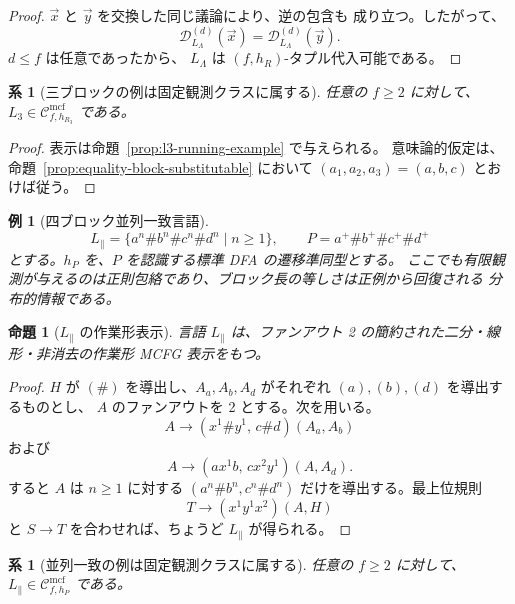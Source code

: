 \documentclass[11pt,a4paper]{ltjsarticle}
\newtheorem{proposition}[theorem]{命題}
\newtheorem{corollary}[theorem]{系}
\newtheorem{example}[theorem]{例}
\theoremstyle{remark}
\newcommand{\Cmcf}[2]{\mathcal{C}^{\mathrm{mcf}}_{#1,#2}}
\newcommand{\D}{\mathcal{D}}
\newcommand{\tuple}[1]{\vec{#1}}
\begin{document}
\begin{proof}
\(\tuple x\) と \(\tuple y\) を交換した同じ議論により、逆の包含も
成り立つ。したがって、
\[
  \D_{L_\Lambda}^{(d)}(\tuple x)
  =
  \D_{L_\Lambda}^{(d)}(\tuple y).
\]
\(d\le f\) は任意であったから、
\(L_\Lambda\) は \((f,h_R)\)-タプル代入可能である。
\end{proof}



\begin{corollary}[三ブロックの例は固定観測クラスに属する]
\label{cor:l3-in-fixed-observation-class}
任意の \(f\ge2\) に対して、\(L_3\in\Cmcf{f}{h_{R_3}}\) である。
\end{corollary}

\begin{proof}
表示は命題~\ref{prop:l3-running-example} で与えられる。
意味論的仮定は、命題~\ref{prop:equality-block-substitutable} において
\((a_1,a_2,a_3)=(a,b,c)\) とおけば従う。
\end{proof}

\begin{example}[四ブロック並列一致言語]
\label{ex:parallel-language}
\[
  L_{\parallel}=\{a^n\#b^n\#c^n\#d^n\mid n\ge1\},
  \qquad P=a^+\#b^+\#c^+\#d^+
\]
とする。\(h_P\) を、\(P\) を認識する標準 DFA の遷移準同型とする。
ここでも有限観測が与えるのは正則包絡であり、ブロック長の等しさは正例から回復される
分布的情報である。
\end{example}

\begin{proposition}[\(L_{\parallel}\) の作業形表示]
\label{prop:parallel-running-example}
言語 \(L_{\parallel}\) は、ファンアウト 2 の簡約された二分・線形・非消去の作業形 MCFG 表示をもつ。
\end{proposition}

\begin{proof}
\(H\) が \((\#)\) を導出し、\(A_a,A_b,A_d\) がそれぞれ \((a),(b),(d)\) を導出するものとし、
\(A\) のファンアウトを 2 とする。次を用いる。
\[
  A\to(x^1\#y^1,\,c\#d)(A_a,A_b)
\]
および
\[
  A\to(a x^1 b,\,c x^2 y^1)(A,A_d).
\]
すると \(A\) は \(n\ge1\) に対する
\((a^n\#b^n,c^n\#d^n)\) だけを導出する。最上位規則
\[
  T\to(x^1y^1x^2)(A,H)
\]
と \(S\to T\) を合わせれば、ちょうど \(L_{\parallel}\) が得られる。
\end{proof}

\begin{corollary}[並列一致の例は固定観測クラスに属する]
\label{cor:parallel-in-fixed-observation-class}
任意の \(f\ge2\) に対して、\(L_{\parallel}\in\Cmcf{f}{h_P}\) である。
\end{corollary}
\end{document}
